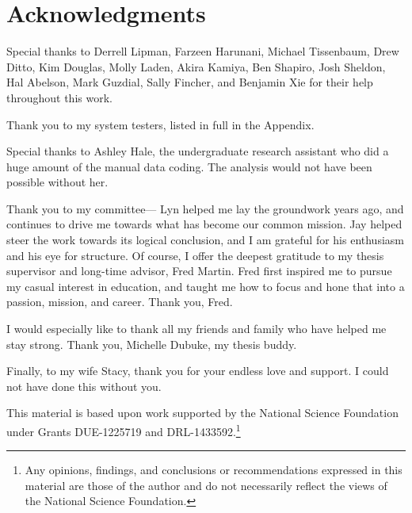 \chapter*{Acknowledgments}
\renewcommand{\thefootnote}{\fnsymbol{footnote}}


Special thanks to Derrell Lipman, Farzeen Harunani, Michael Tissenbaum, Drew Ditto, Kim Douglas, Molly Laden, Akira Kamiya, Ben Shapiro, Josh Sheldon, Hal Abelson, Mark Guzdial, Sally Fincher, and Benjamin Xie for their help throughout this work.

Thank you to my system testers, listed in full in the Appendix.


Special thanks to Ashley Hale, the undergraduate research assistant who did a huge amount of the manual data coding. The analysis would not have been possible without her.

Thank you to my committee--- Lyn helped me lay the groundwork years ago, and continues to drive me towards what has become our common mission. Jay helped steer the work towards its logical conclusion, and I am grateful for his enthusiasm and his eye for structure. Of course, I offer the deepest gratitude to my thesis supervisor and long-time advisor, Fred Martin. Fred first inspired me to pursue my casual interest in education, and taught me how to focus and hone that into a passion, mission, and career. Thank you, Fred. 

I would especially like to thank all my friends and family who have helped me stay strong. Thank you, Michelle Dubuke, my thesis buddy.

Finally, to my wife Stacy, thank you for your endless love and support. I could not have done this without you.


This material is based upon work supported by the National Science Foundation under Grants DUE-1225719 and DRL-1433592.\footnote{Any opinions, findings, and conclusions or recommendations expressed in this material are those of the author and do not necessarily reflect the views of the National Science Foundation.}

\renewcommand{\thefootnote}{\arabic{footnote}}